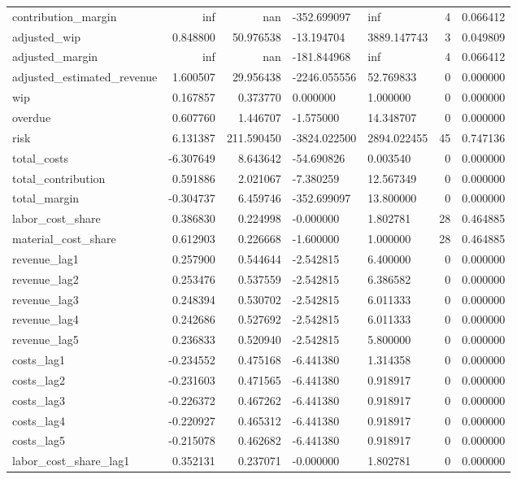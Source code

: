 \begin{landscape}
\begin{longtable}[h!]{lrrllrr}
contribution_margin & inf & nan & -352.699097 & inf & 4 & 0.066412 \\
adjusted_wip & 0.848800 & 50.976538 & -13.194704 & 3889.147743 & 3 & 0.049809 \\
adjusted_margin & inf & nan & -181.844968 & inf & 4 & 0.066412 \\
adjusted_estimated_revenue & 1.600507 & 29.956438 & -2246.055556 & 52.769833 & 0 & 0.000000 \\
wip & 0.167857 & 0.373770 & 0.000000 & 1.000000 & 0 & 0.000000 \\
overdue & 0.607760 & 1.446707 & -1.575000 & 14.348707 & 0 & 0.000000 \\
risk & 6.131387 & 211.590450 & -3824.022500 & 2894.022455 & 45 & 0.747136 \\
total_costs & -6.307649 & 8.643642 & -54.690826 & 0.003540 & 0 & 0.000000 \\
total_contribution & 0.591886 & 2.021067 & -7.380259 & 12.567349 & 0 & 0.000000 \\
total_margin & -0.304737 & 6.459746 & -352.699097 & 13.800000 & 0 & 0.000000 \\
labor_cost_share & 0.386830 & 0.224998 & -0.000000 & 1.802781 & 28 & 0.464885 \\
material_cost_share & 0.612903 & 0.226668 & -1.600000 & 1.000000 & 28 & 0.464885 \\
revenue_lag1 & 0.257900 & 0.544644 & -2.542815 & 6.400000 & 0 & 0.000000 \\
revenue_lag2 & 0.253476 & 0.537559 & -2.542815 & 6.386582 & 0 & 0.000000 \\
revenue_lag3 & 0.248394 & 0.530702 & -2.542815 & 6.011333 & 0 & 0.000000 \\
revenue_lag4 & 0.242686 & 0.527692 & -2.542815 & 6.011333 & 0 & 0.000000 \\
revenue_lag5 & 0.236833 & 0.520940 & -2.542815 & 5.800000 & 0 & 0.000000 \\
costs_lag1 & -0.234552 & 0.475168 & -6.441380 & 1.314358 & 0 & 0.000000 \\
costs_lag2 & -0.231603 & 0.471565 & -6.441380 & 0.918917 & 0 & 0.000000 \\
costs_lag3 & -0.226372 & 0.467262 & -6.441380 & 0.918917 & 0 & 0.000000 \\
costs_lag4 & -0.220927 & 0.465312 & -6.441380 & 0.918917 & 0 & 0.000000 \\
costs_lag5 & -0.215078 & 0.462682 & -6.441380 & 0.918917 & 0 & 0.000000 \\
labor_cost_share_lag1 & 0.352131 & 0.237071 & -0.000000 & 1.802781 & 0 & 0.000000 \\

\end{longtable}
\end{landscape}
